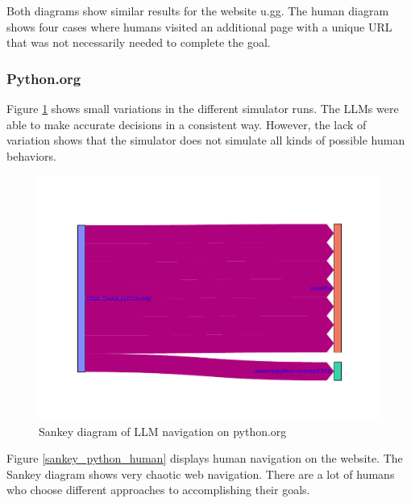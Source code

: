 Both diagrams show similar results for the website u.gg. The human diagram shows four cases where humans visited an additional page with a unique URL that was not necessarily needed to complete the goal.

\subsubsection{Python.org}

Figure \ref{sankey_python_llm} shows small variations in the different simulator runs. The LLMs were able to make accurate decisions in a consistent way. However, the lack of variation shows that the simulator does not simulate all kinds of possible human behaviors. 

\begin{figure}[H]
    \centering
    \includegraphics[width=\textwidth]{obrazky-figures/sankey_python_llm.pdf}
    \caption{Sankey diagram of LLM navigation on python.org}
    \label{sankey_python_llm}
\end{figure}

Figure \ref{sankey_python_human} displays human navigation on the website. The Sankey diagram shows very chaotic web navigation. There are a lot of humans who choose different approaches to accomplishing their goals.

